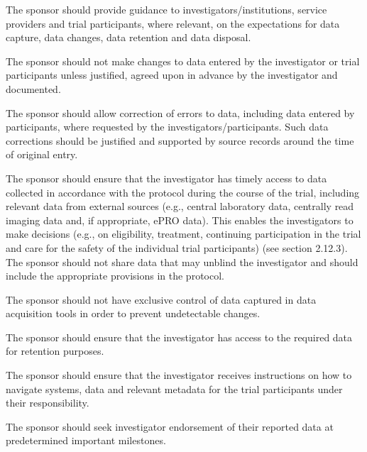 \documentclass[11pt]{article}
\begin{document}
\begin{description}[leftmargin=2.5cm,style=sameline]

\item[(h)] The sponsor should provide guidance to investigators/institutions, service providers and trial participants, where relevant, on the expectations for data capture, data changes, data retention and data disposal.

\item[(i)] The sponsor should not make changes to data entered by the investigator or trial participants unless justified, agreed upon in advance by the investigator and documented.

\item[(j)] The sponsor should allow correction of errors to data, including data entered by participants, where requested by the investigators/participants. Such data corrections should be justified and supported by source records around the time of original entry.

\item[(k)] The sponsor should ensure that the investigator has timely access to data collected in accordance with the protocol during the course of the trial, including relevant data from external sources (e.g., central laboratory data, centrally read imaging data and, if appropriate, ePRO data). This enables the investigators to make decisions (e.g., on eligibility, treatment, continuing participation in the trial and care for the safety of the individual trial participants) (see section 2.12.3). The sponsor should not share data that may unblind the investigator and should include the appropriate provisions in the protocol.

\item[(l)] The sponsor should not have exclusive control of data captured in data acquisition tools in order to prevent undetectable changes.

\item[(m)] The sponsor should ensure that the investigator has access to the required data for retention purposes.

\item[(n)] The sponsor should ensure that the investigator receives instructions on how to navigate systems, data and relevant metadata for the trial participants under their responsibility.

\item[(o)] The sponsor should seek investigator endorsement of their reported data at predetermined important milestones.


\end{description}
\end{document}
